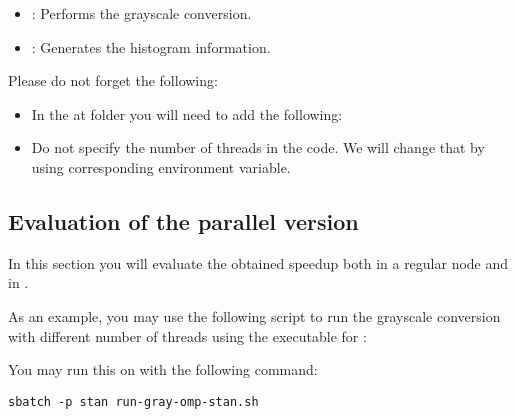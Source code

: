 \begin{itemize}

\item {}: Performs the grayscale
conversion.
\item {}: Generates the histogram
information.

\end{itemize}

Please do not forget the following:

\begin{itemize}

\item In the  at  folder you will need to
add the following:



\item Do not specify the number of threads in the code. We will change that by
using corresponding environment variable.

\end{itemize}

\subsection{Evaluation of the parallel version}

In this section you will evaluate the obtained speedup both in a regular
node and in .

As an example, you may use the following script to run the grayscale conversion
with different number of threads using the executable for :



You may run this on  with the following command:

\begin{lstlisting}[style=terminal]
sbatch -p stan run-gray-omp-stan.sh
\end{lstlisting}

